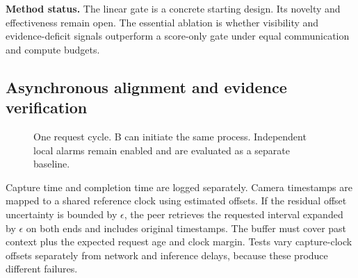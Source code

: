 \documentclass[10pt,a4paper]{article}
\newcommand{\note}[1]{\par\smallskip\noindent\colorbox{pale}{\parbox{\dimexpr\linewidth-2\fboxsep\relax}{#1}}\par\smallskip}
\begin{document}
\note{\small\textbf{Method status.} The linear gate is a concrete starting design. Its novelty and effectiveness remain open. The essential ablation is whether visibility and evidence-deficit signals outperform a score-only gate under equal communication and compute budgets.}

\newpage
\subsection{Asynchronous alignment and evidence verification}
\begin{figure}[h]
\centering
{}
\caption{One request cycle. B can initiate the same process. Independent local alarms remain enabled and are evaluated as a separate baseline.}
\end{figure}

Capture time and completion time are logged separately. Camera timestamps are mapped to a shared reference clock using estimated offsets. If the residual offset uncertainty is bounded by $\epsilon$, the peer retrieves the requested interval expanded by $\epsilon$ on both ends and includes original timestamps. The buffer must cover past context plus the expected request age and clock margin. Tests vary capture-clock offsets separately from network and inference delays, because these produce different failures.
\end{document}
